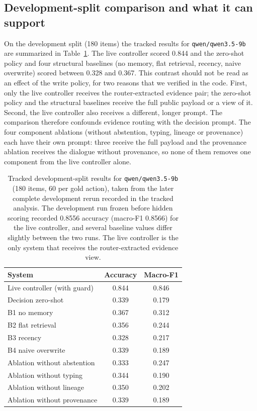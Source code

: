 \subsection{Development-split comparison and what it can support}
On the development split (180 items) the tracked results for \texttt{qwen/qwen3.5-9b} are summarized in Table~\ref{tab:dev}. The live controller scored 0.844 and the zero-shot policy and four structural baselines (no memory, flat retrieval, recency, naive overwrite) scored between 0.328 and 0.367. This contrast should not be read as an effect of the write policy, for two reasons that we verified in the code. First, only the live controller receives the router-extracted evidence pair; the zero-shot policy and the structural baselines receive the full public payload or a view of it. Second, the live controller also receives a different, longer prompt. The comparison therefore confounds evidence routing with the decision prompt. The four component ablations (without abstention, typing, lineage or provenance) each have their own prompt: three receive the full payload and the provenance ablation receives the dialogue without provenance, so none of them removes one component from the live controller alone.

\begin{table}[t]
\centering\small
\caption{Tracked development-split results for \texttt{qwen/qwen3.5-9b} (180 items, 60 per gold action), taken from the later complete development rerun recorded in the tracked analysis. The development run frozen before hidden scoring recorded 0.8556 accuracy (macro-F1 0.8566) for the live controller, and several baseline values differ slightly between the two runs. The live controller is the only system that receives the router-extracted evidence view.}
\label{tab:dev}
\begin{tabular}{lcc}
\toprule
System & Accuracy & Macro-F1 \\
\midrule
Live controller (with guard) & 0.844 & 0.846 \\
Decision zero-shot & 0.339 & 0.179 \\
B1 no memory & 0.367 & 0.312 \\
B2 flat retrieval & 0.356 & 0.244 \\
B3 recency & 0.328 & 0.217 \\
B4 naive overwrite & 0.339 & 0.189 \\
Ablation without abstention & 0.333 & 0.247 \\
Ablation without typing & 0.344 & 0.190 \\
Ablation without lineage & 0.350 & 0.202 \\
Ablation without provenance & 0.339 & 0.189 \\
\bottomrule
\end{tabular}
\end{table}

